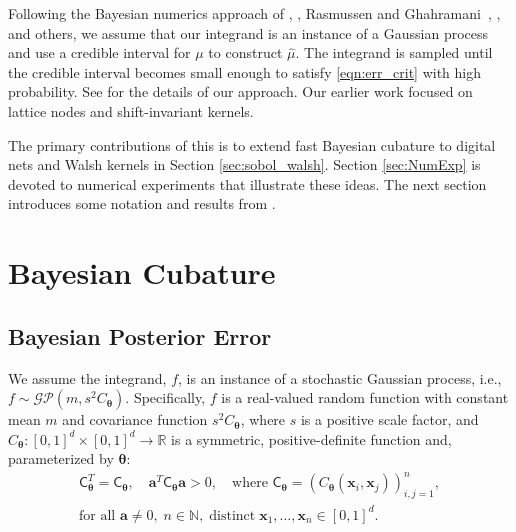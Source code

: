 \documentclass[graybox,footinfo]{svmult}
\newcommand{\bm}[1]{\boldsymbol{#1}}
\newcommand{\vtheta}{{\bm{\theta}}}
\newcommand{\va}{\bm{a}}
\newcommand{\vx}{\bm{x}}
\newcommand{\mC}{\mathsf{C}}
\newcommand{\hmu}{\widehat{\mu}}
\begin{document}
Following the Bayesian numerics approach of \cite{Dia88a}, \cite{OHa91a}, Rasmussen and Ghahramani~\cite{RasGha03a}, \cite{BriEtal18a}, and others, we assume that our integrand is an instance of a Gaussian process and use a credible interval for $\mu$ to construct $\hmu$.  The integrand is sampled until the credible interval becomes small enough to satisfy \eqref{eqn:err_crit}  with high probability.  See \cite{RatHic19a} for the details of our approach.  Our earlier work focused on lattice nodes and shift-invariant kernels.

The primary contributions of this 
is to extend fast Bayesian cubature to digital nets and Walsh kernels in Section \ref{sec:sobol_walsh}.  Section \ref{sec:NumExp} is devoted to numerical experiments that illustrate these ideas.  The next section introduces some notation and results from \cite{RatHic19a}.





\section{Bayesian Cubature}
\label{sec:BC} 

\subsection{Bayesian Posterior Error}
\label{sec:BayesPostErr}

We assume the integrand, $f$, is an instance of a stochastic Gaussian process, i.e., $f \sim \mathcal{GP}(m,s^2 C_\vtheta)$.  Specifically, $f$ is a real-valued random function with constant mean $m$ and covariance function $s^2C_\vtheta$, where $s$ is a positive scale factor, and $C_\vtheta: [0,1]^d \times [0,1]^d \to \mathbb{R} $ is a symmetric, positive-definite function and, parameterized by $\vtheta$:
\begin{multline} \label{FJH:eq:CondPosDef}
\mC_\vtheta^T = \mC_\vtheta,  \quad \va^T \mC_\vtheta \va > 0, \quad \text{where }  \mC_\vtheta = \left(  C_\vtheta(\vx_i,\vx_j)  \right)_{i,j=1}^n,\\
\text{for all } \va \ne 0, \;
n\in \mathbb{N}, \; \text{distinct} \; \vx_1, \ldots, \vx_n \in [0,1]^d.
\end{multline}
\end{document}
